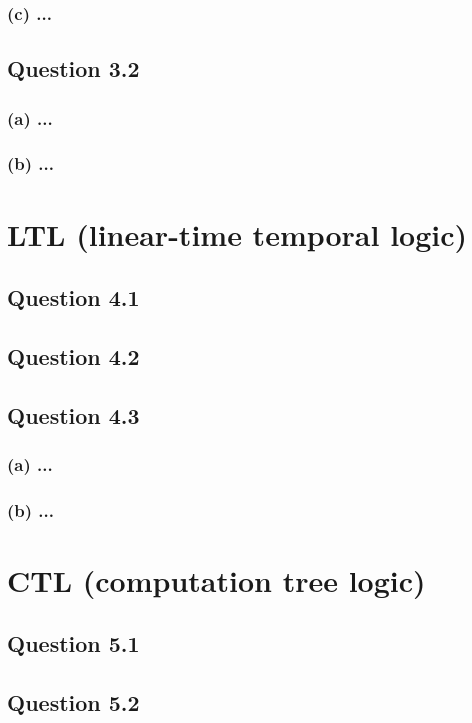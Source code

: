 \documentclass[10pt,a4paper]{article}
\begin{document}
\subsubsection*{(c) \mdseries ...}

\subsection*{Question 3.2}
\subsubsection*{(a) \mdseries ...}
\subsubsection*{(b) \mdseries ...}

\section{LTL (linear-time temporal logic)}
\subsection*{Question 4.1}
\subsection*{Question 4.2}
\subsection*{Question 4.3}
\subsubsection*{(a) \mdseries ...}
\subsubsection*{(b) \mdseries ...}

\section{CTL (computation tree logic)}
\subsection*{Question 5.1}
\subsection*{Question 5.2}
\end{document}
